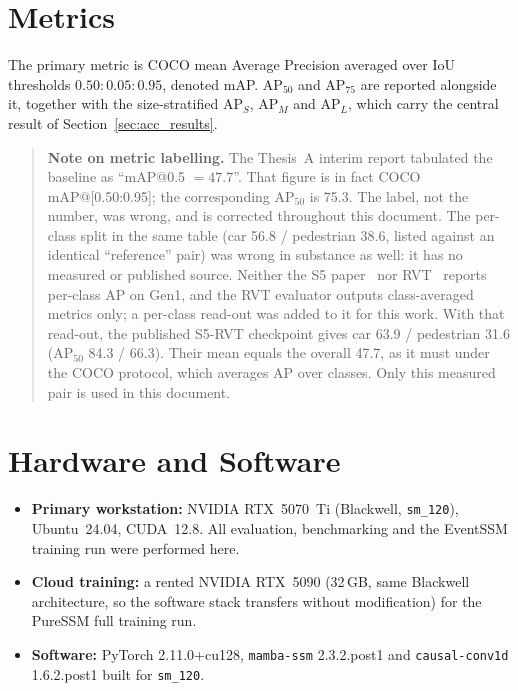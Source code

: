 \documentclass[11pt, a4paper]{report}
\begin{document}
\section{Metrics}
\label{sec:metrics}
The primary metric is COCO mean Average Precision averaged over IoU thresholds $0.50\!:\!0.05\!:\!0.95$,
denoted mAP. $\mathrm{AP}_{50}$ and $\mathrm{AP}_{75}$ are reported alongside it, together with the
size-stratified $\mathrm{AP}_S$, $\mathrm{AP}_M$ and $\mathrm{AP}_L$, which carry the central result of
Section~\ref{sec:acc_results}.

\begin{quote}\small
\textbf{Note on metric labelling.} The Thesis~A interim report tabulated the baseline as
``mAP@0.5 $=47.7$''. That figure is in fact COCO mAP@[0.50:0.95]; the corresponding $\mathrm{AP}_{50}$
is 75.3. The label, not the number, was wrong, and is corrected throughout this document.
The per-class split in the same table (car 56.8 / pedestrian 38.6, listed against an identical
``reference'' pair) was wrong in substance as well: it has no measured or published source. Neither the
S5 paper~\cite{zubic2024state} nor RVT~\cite{gehrig2023recurrent} reports per-class AP on Gen1, and the
RVT evaluator outputs class-averaged metrics only; a per-class read-out was added to it for this work.
With that read-out, the published S5-RVT checkpoint gives car 63.9 / pedestrian 31.6
($\mathrm{AP}_{50}$ 84.3 / 66.3). Their mean equals the overall 47.7, as it must under the COCO
protocol, which averages AP over classes. Only this measured pair is used in this document.
\end{quote}

\section{Hardware and Software}
\label{sec:hardware}
\begin{itemize}
  \item \textbf{Primary workstation:} NVIDIA RTX~5070~Ti (Blackwell, \texttt{sm\_120}), Ubuntu~24.04,
        CUDA~12.8. All evaluation, benchmarking and the EventSSM training run were performed here.
  \item \textbf{Cloud training:} a rented NVIDIA RTX~5090 (32\,GB, same Blackwell architecture, so the
        software stack transfers without modification) for the PureSSM full training run.
  \item \textbf{Software:} PyTorch 2.11.0+cu128, \texttt{mamba-ssm} 2.3.2.post1 and
        \texttt{causal-conv1d} 1.6.2.post1 built for \texttt{sm\_120}.
\end{itemize}
\end{document}
